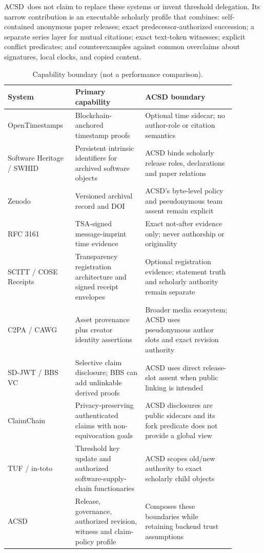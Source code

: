 \documentclass[11pt]{article}
\newcommand{\acsd}{\textsc{ACSD}}
\begin{document}
\acsd\ does not claim to replace these systems or invent threshold delegation. Its narrow contribution is an executable scholarly profile that combines: self-contained anonymous paper releases; exact predecessor-authorized succession; a separate series layer for mutual citations; exact text-token witnesses; explicit conflict predicates; and counterexamples against common overclaims about signatures, local clocks, and copied content.

\begin{table}[H]
\centering
\caption{Capability boundary (not a performance comparison).}
\begin{tabular}{p{0.23\linewidth}p{0.29\linewidth}p{0.36\linewidth}}
\toprule
System & Primary capability & ACSD boundary \\
\midrule
OpenTimestamps & Blockchain-anchored timestamp proofs & Optional time sidecar; no author-role or citation semantics \\
Software Heritage / SWHID & Persistent intrinsic identifiers for archived software objects & ACSD binds scholarly release roles, declarations and paper relations \\
Zenodo & Versioned archival record and DOI & ACSD's byte-level policy and pseudonymous team assent remain explicit \\
RFC 3161 & TSA-signed message-imprint time evidence & Exact not-after evidence only; never authorship or originality \\
SCITT / COSE Receipts & Transparency registration architecture and signed receipt envelopes & Optional registration evidence; statement truth and scholarly authority remain separate \\
C2PA / CAWG & Asset provenance plus creator identity assertions & Broader media ecosystem; ACSD uses pseudonymous author slots and exact revision authority \\
SD-JWT / BBS VC & Selective claim disclosure; BBS can add unlinkable derived proofs & ACSD uses direct release-slot assent when public linking is intended \\
ClaimChain & Privacy-preserving authenticated claims with non-equivocation goals & ACSD disclosures are public sidecars and its fork predicate does not provide a global view \\
TUF / in-toto & Threshold key update and authorized software-supply-chain functionaries & ACSD scopes old/new authority to exact scholarly child objects \\
ACSD & Release, governance, authorized revision, witness and claim-policy profile & Composes these boundaries while retaining backend trust assumptions \\
\bottomrule
\end{tabular}
\end{table}
\end{document}
